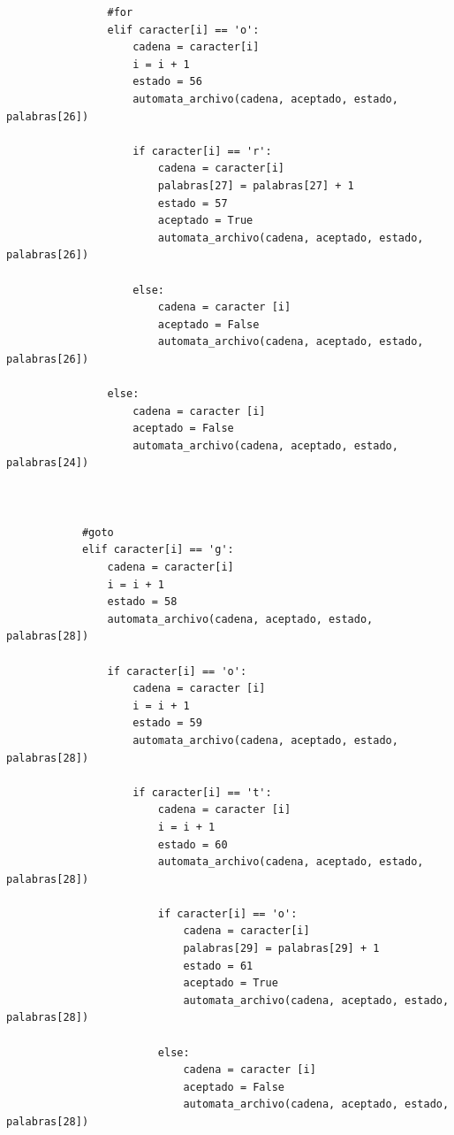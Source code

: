 \documentclass{article}
\begin{document}
\begin{flushleft}
\begin{lstlisting}
                #for
                elif caracter[i] == 'o':
                    cadena = caracter[i]
                    i = i + 1
                    estado = 56
                    automata_archivo(cadena, aceptado, estado, palabras[26])
                    
                    if caracter[i] == 'r':
                        cadena = caracter[i]
                        palabras[27] = palabras[27] + 1
                        estado = 57
                        aceptado = True
                        automata_archivo(cadena, aceptado, estado, palabras[26])
                                
                    else:
                        cadena = caracter [i]
                        aceptado = False
                        automata_archivo(cadena, aceptado, estado, palabras[26])
                                
                else:
                    cadena = caracter [i]
                    aceptado = False
                    automata_archivo(cadena, aceptado, estado, palabras[24])
                
                
            
            #goto
            elif caracter[i] == 'g':
                cadena = caracter[i]
                i = i + 1
                estado = 58
                automata_archivo(cadena, aceptado, estado, palabras[28])
                
                if caracter[i] == 'o':
                    cadena = caracter [i]
                    i = i + 1
                    estado = 59
                    automata_archivo(cadena, aceptado, estado, palabras[28])   
                    
                    if caracter[i] == 't':
                        cadena = caracter [i]
                        i = i + 1
                        estado = 60
                        automata_archivo(cadena, aceptado, estado, palabras[28])
                        
                        if caracter[i] == 'o':
                            cadena = caracter[i]
                            palabras[29] = palabras[29] + 1
                            estado = 61
                            aceptado = True
                            automata_archivo(cadena, aceptado, estado, palabras[28])
                            
                        else:
                            cadena = caracter [i]
                            aceptado = False
                            automata_archivo(cadena, aceptado, estado, palabras[28])
                            

\end{lstlisting}
\end{flushleft}
\end{document}
